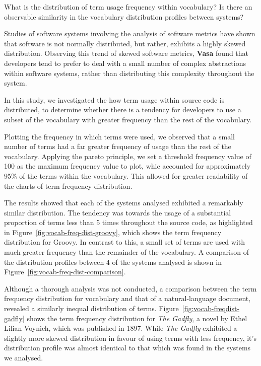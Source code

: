What is the distribution of term usage frequency within vocabulary? Is there an observable similarity in the vocabulary distribution profiles between systems?

Studies of software systems involving the analysis of software metrics have shown that software is not normally distributed, but rather, exhibits a highly skewed distribution. Observing this trend of skewed software metrics, \textbf{Vasa} found that developers tend to prefer to deal with a small number of complex abstractions within software systems, rather than distributing this complexity throughout the system.

In this study, we investigated the how term usage within source code is distributed, to determine whether there is a tendency for developers to use a subset of the vocabulary with greater frequency than the rest of the vocabulary.

Plotting the frequency in which terms were used, we observed that a small number of terms had a far greater frequency of usage than the rest of the vocabulary. Applying the pareto principle, we set a threshold frequency value of 100 as the maximum frequency value to plot, whic accounted for approximately 95\% of the terms within the vocabulary. This allowed for greater readability of the charts of term frequency distribution.

The results showed that each of the systems analysed exhibited a remarkably similar distribution. The tendency was towards the usage of a substantial proportion of terms less than 5 times throughout the source code, as highlighted in Figure~\ref{fig:vocab-freq-dist-groovy}, which shows the term frequency distribution for Groovy. In contrast to this, a small set of terms are used with much greater frequency than the remainder of the vocabulary. A comparison of the distribution profiles between 4 of the systems analysed is shown in Figure~\ref{fig:vocab-freq-dist-comparison}.

Although a thorough analysis was not conducted, a comparison between the term frequency distribution for vocabulary and that of a natural-language document, revealed a similarly inequal distribution of terms. Figure~\ref{fig:vocab-freqdist-gadfly} shows the term frequency distribution for \emph{The Gadfly}, a novel by Ethel Lilian Voynich, which was published in 1897. While \emph{The Gadfly} exhibited a slightly more skewed distribution in favour of using terms with less frequency, it's distribution profile was almost identical to that which was found in the systems we analysed.

